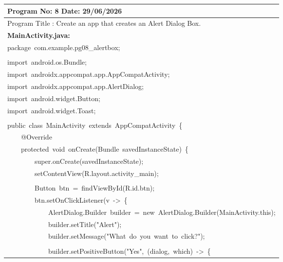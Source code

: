 \documentclass[a4paper,12pt]{article}
\begin{document}
\noindent\begingroup
\renewcommand{\arraystretch}{1.1}
\begin{longtable}{|p{}|}
\hline\endfirsthead\hline\endhead\hline\endfoot\hline\endlastfoot
\rule{0pt}{13pt}Program No: 8 \hfill Date: 29/06/2026 \\
\hline
\rule{0pt}{13pt}Program Title : Create an app that creates an Alert Dialog Box. \\
\hline
\rule{0pt}{13pt}\textbf{MainActivity.java:} \\
\hline
{\ttfamily\small package\ com.example.pg08\_alertbox;} \\
\strut \\
{\ttfamily\small import\ android.os.Bundle;} \\
{\ttfamily\small import\ androidx.appcompat.app.AppCompatActivity;} \\
{\ttfamily\small import\ androidx.appcompat.app.AlertDialog;} \\
{\ttfamily\small import\ android.widget.Button;} \\
{\ttfamily\small import\ android.widget.Toast;} \\
\strut \\
{\ttfamily\small public\ class\ MainActivity\ extends\ AppCompatActivity\ \{} \\
{\ttfamily\small \ \ \ \ @Override} \\
{\ttfamily\small \ \ \ \ protected\ void\ onCreate(Bundle\ savedInstanceState)\ \{} \\
{\ttfamily\small \ \ \ \ \ \ \ \ super.onCreate(savedInstanceState);} \\
{\ttfamily\small \ \ \ \ \ \ \ \ setContentView(R.layout.activity\_main);} \\
\strut \\
{\ttfamily\small \ \ \ \ \ \ \ \ Button\ btn\ =\ findViewById(R.id.btn);} \\
{\ttfamily\small \ \ \ \ \ \ \ \ btn.setOnClickListener(v\ -\textgreater{}\ \{} \\
{\ttfamily\small \ \ \ \ \ \ \ \ \ \ \ \ AlertDialog.Builder\ builder\ =\ new\ AlertDialog.Builder(MainActivity.this);} \\
{\ttfamily\small \ \ \ \ \ \ \ \ \ \ \ \ builder.setTitle("Alert");} \\
{\ttfamily\small \ \ \ \ \ \ \ \ \ \ \ \ builder.setMessage("What\ do\ you\ want\ to\ click?");} \\
\strut \\
{\ttfamily\small \ \ \ \ \ \ \ \ \ \ \ \ builder.setPositiveButton("Yes",\ (dialog,\ which)\ -\textgreater{}\ \{} \\

\end{longtable}
\end{document}
